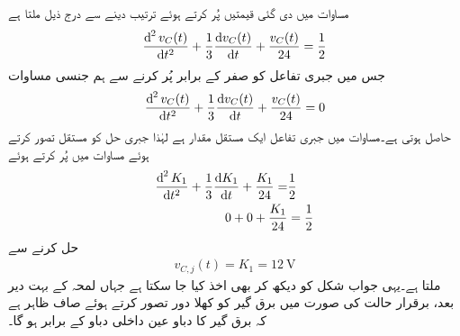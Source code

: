مساوات  میں دی گئی قیمتیں پُر کرتے ہوئے ترتیب دینے سے درج ذیل ملتا ہے
\begin{align}\label{مساوات_عارضی_مثال_سلسلہ_وار_پ}
\frac{\dif^{\,2} v_C(t)}{\dif t^2}+\frac{1}{3}\frac{\dif v_C(t)}{\dif t}+\frac{v_C(t)}{24}=\frac{1}{2}
\end{align}
جس میں جبری تفاعل کو صفر کے برابر پُر کرنے سے ہم جنسی مساوات
\begin{align}\label{مساوات_مثال_ہم_جنسی_دو_درجی}
\frac{\dif^{\,2} v_C(t)}{\dif t^2}+\frac{1}{3}\frac{\dif v_C(t)}{\dif t}+\frac{v_C(t)}{24}=0
\end{align}
حاصل ہوتی ہے۔مساوات  میں جبری تفاعل ایک مستقل مقدار ہے لہٰذا جبری حل کو مستقل  تصور کرتے ہوئے مساوات  میں پُر کرتے ہوئے
\begin{align*}
\frac{\dif^{\,2} K_1}{\dif t^2}+\frac{1}{3}\frac{\dif K_1}{\dif t}+\frac{K_1}{24}=&\frac{1}{2}\\
0+0+\frac{K_1}{24}&=\frac{1}{2}
\end{align*}
حل کرنے سے
\begin{align*}
v_{C,j}(t)=K_1=\SI{12}{\volt}
\end{align*}
ملتا ہے۔یہی جواب شکل  کو دیکھ کر بھی اخذ کیا جا سکتا ہے جہاں لمحہ  کے بہت دیر بعد، برقرار  حالت کی صورت میں برق گیر کو کھلا دور تصور کرتے ہوئے صاف ظاہر ہے کہ برق گیر کا دباو عین داخلی دباو کے برابر ہو گا۔


